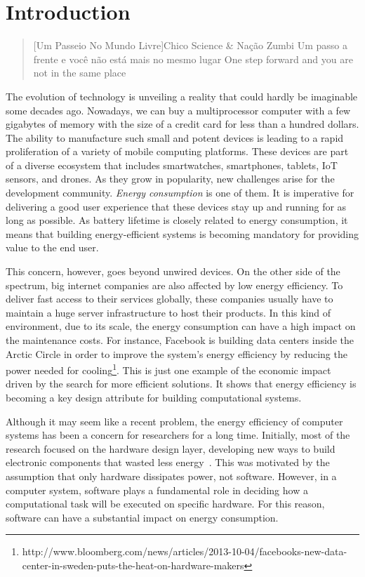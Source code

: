 \chapter{Introduction}\label{chp:introduction}

\begin{quotation}[Um Passeio No Mundo Livre]{Chico Science \& Nação Zumbi}
Um passo a frente e você não está mais no mesmo lugar
\linebreak
One step forward and you are not in the same place
\end{quotation}

The evolution of technology is unveiling a reality that could hardly be imaginable some decades ago. Nowadays, we can buy a multiprocessor computer with a few gigabytes of memory with the size of a credit card for less than a hundred dollars. The ability to manufacture such small and potent devices is leading to a rapid proliferation of a variety of mobile computing platforms. These devices are part of a diverse ecosystem that includes smartwatches, smartphones, tablets, IoT sensors, and drones. As they grow in popularity, new challenges arise for the development community. \emph{Energy consumption} is one of them. It is imperative for delivering a good user experience that these devices stay up and running for as long as possible. As battery lifetime is closely related to energy consumption, it means that building energy-efficient systems is becoming mandatory for providing value to the end user.

This concern, however, goes beyond unwired devices. On the other side of the spectrum, big internet companies are also affected by low energy efficiency. To deliver fast access to their services globally, these companies usually have to maintain a huge server infrastructure to host their products. In this kind of environment, due to its scale, the energy consumption can have a high impact on the maintenance costs. For instance, Facebook is building data centers inside the Arctic Circle in order to improve the system's energy efficiency by reducing the power needed for cooling\footnote{http://www.bloomberg.com/news/articles/2013-10-04/facebooks-new-data-center-in-sweden-puts-the-heat-on-hardware-makers}. This is just one example of the economic impact driven by the search for more efficient solutions. It shows that energy efficiency is becoming a key design attribute for building computational systems.

Although it may seem like a recent problem, the energy efficiency of computer systems has been a concern for researchers for a long time. Initially, most of the research focused on the hardware design layer, developing new ways to build electronic components that wasted less energy~\cite{chandrakasan:1992}. This was motivated by the assumption that only hardware dissipates power, not software. However, in a computer system, software plays a fundamental role in deciding how a computational task will be executed on specific hardware. For this reason, software can have a substantial impact on energy consumption.


